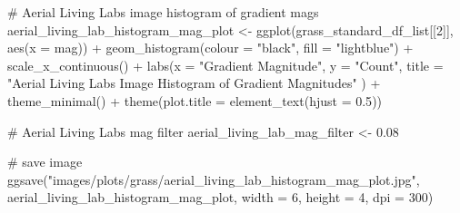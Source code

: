 \documentclass[
  letterpaper,
  DIV=11,
  numbers=noendperiod]{scrreprt}
\newenvironment{Shaded}{\begin{snugshade}}{\end{snugshade}}
\newcommand{\AttributeTok}[1]{\textcolor[rgb]{0.40,0.45,0.13}{#1}}
\newcommand{\CommentTok}[1]{\textcolor[rgb]{0.37,0.37,0.37}{#1}}
\newcommand{\DecValTok}[1]{\textcolor[rgb]{0.68,0.00,0.00}{#1}}
\newcommand{\FloatTok}[1]{\textcolor[rgb]{0.68,0.00,0.00}{#1}}
\newcommand{\FunctionTok}[1]{\textcolor[rgb]{0.28,0.35,0.67}{#1}}
\newcommand{\NormalTok}[1]{\textcolor[rgb]{0.00,0.23,0.31}{#1}}
\newcommand{\OtherTok}[1]{\textcolor[rgb]{0.00,0.23,0.31}{#1}}
\newcommand{\SpecialCharTok}[1]{\textcolor[rgb]{0.37,0.37,0.37}{#1}}
\newcommand{\StringTok}[1]{\textcolor[rgb]{0.13,0.47,0.30}{#1}}
\begin{document}
\begin{Shaded}
\begin{Highlighting}[]
\CommentTok{\# Aerial Living Labs image histogram of gradient mags}
\NormalTok{aerial\_living\_lab\_histogram\_mag\_plot }\OtherTok{\textless{}{-}}
  \FunctionTok{ggplot}\NormalTok{(grass\_standard\_df\_list[[}\DecValTok{2}\NormalTok{]], }
         \FunctionTok{aes}\NormalTok{(}\AttributeTok{x =}\NormalTok{ mag)) }\SpecialCharTok{+}
  \FunctionTok{geom\_histogram}\NormalTok{(}\AttributeTok{colour =} \StringTok{"black"}\NormalTok{, }\AttributeTok{fill =} \StringTok{"lightblue"}\NormalTok{) }\SpecialCharTok{+}
  \FunctionTok{scale\_x\_continuous}\NormalTok{() }\SpecialCharTok{+} 
  \FunctionTok{labs}\NormalTok{(}\AttributeTok{x =} \StringTok{"Gradient Magnitude"}\NormalTok{, }
       \AttributeTok{y =} \StringTok{"Count"}\NormalTok{, }
       \AttributeTok{title =} \StringTok{"Aerial Living Labs Image Histogram of Gradient Magnitudes"}
\NormalTok{  ) }\SpecialCharTok{+}
  \FunctionTok{theme\_minimal}\NormalTok{() }\SpecialCharTok{+}
  \FunctionTok{theme}\NormalTok{(}\AttributeTok{plot.title =} \FunctionTok{element\_text}\NormalTok{(}\AttributeTok{hjust =} \FloatTok{0.5}\NormalTok{))}

\CommentTok{\# Aerial Living Labs mag filter}
\NormalTok{aerial\_living\_lab\_mag\_filter }\OtherTok{\textless{}{-}} \FloatTok{0.08}

\CommentTok{\# save image}
\FunctionTok{ggsave}\NormalTok{(}\StringTok{"images/plots/grass/aerial\_living\_lab\_histogram\_mag\_plot.jpg"}\NormalTok{, }
\NormalTok{       aerial\_living\_lab\_histogram\_mag\_plot, }\AttributeTok{width =} \DecValTok{6}\NormalTok{, }\AttributeTok{height =} \DecValTok{4}\NormalTok{, }\AttributeTok{dpi =} \DecValTok{300}\NormalTok{)}
\end{Highlighting}
\end{Shaded}
\end{document}
